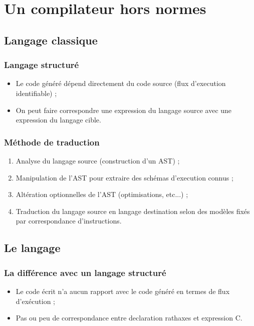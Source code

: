 \documentclass[]{beamer}
\begin{document}
\section{Un compilateur hors normes}

\subsection{Langage classique}
\begin{frame}
\frametitle{Langage structuré}
\begin{itemize}[<+->]
    \item Le code généré dépend directement du code source
        (flux d'execution identifiable) ;
    \item On peut faire correspondre une expression du langage source avec
        une expression du langage cible.
\end{itemize}
\end{frame}

\begin{frame}
\frametitle{Méthode de traduction}
\begin{enumerate}[<+->]
    \item Analyse du langage source (construction d'un AST) ;
    \item Manipulation de l'AST pour extraire des schémas d'execution connus ;
    \item Altération optionnelles de l'AST (optimisations, etc...) ;
    \item Traduction du langage source en langage destination selon des
            modèles fixés par correspondance d'instructions.
\end{enumerate}
\end{frame}

\subsection{Le langage \rtx}
\begin{frame}
\frametitle{La différence avec un langage structuré}
\begin{itemize}[<+->]
    \item Le code écrit n'a aucun rapport avec le code généré en termes
        de flux d'exécution ;
    \item Pas ou peu de correspondance entre declaration rathaxes
        et expression C.
\end{itemize}
\end{frame}
\end{document}
